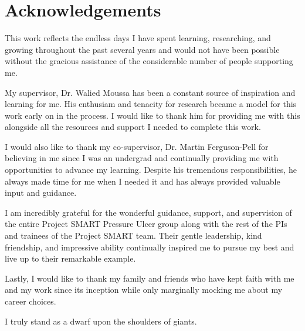 \onehalfspacing
\chapter*{Acknowledgements}
	This work reflects the endless days I have spent learning, researching, and growing throughout the past several years and would not have been possible without the gracious assistance of the considerable number of people supporting me.

	My supervisor, Dr. Walied Moussa has been a constant source of inspiration and learning for me. His enthusiam and tenacity for research became a model for this work early on in the process. I would like to thank him for providing me with this alongside all the resources and support I needed to complete this work.

	I would also like to thank my co-supervisor, Dr. Martin Ferguson-Pell for believing in me since I was an undergrad and continually providing me with opportunities to advance my learning. Despite his tremendous responsibilities, he always made time for me when I needed it and has always provided valuable input and guidance.

	I am incredibly grateful for the wonderful guidance, support, and supervision of the entire Project SMART Pressure Ulcer group along with the rest of the PIs and trainees of the Project SMART team. Their gentle leadership, kind friendship, and impressive ability continually inspired me to pursue my best and live up to their remarkable example.

	Lastly, I would like to thank my family and friends who have kept faith with me and my work since its inception while only marginally mocking me about my career choices.

	I truly stand as a dwarf upon the shoulders of giants.
